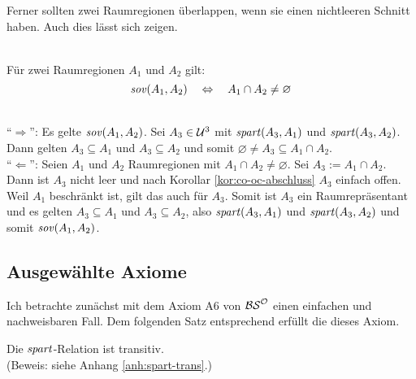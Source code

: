 %    
%    
%    
    Ferner sollten zwei Raumregionen überlappen, wenn sie einen nichtleeren Schnitt haben.
		Auch dies lässt sich zeigen.
    \begin{satz}\label{satz:sov-raumreg}\ \\
        Für zwei Raumregionen $A_1$ und $A_2$ gilt: 
        $$\mathit{sov}(A_1,A_2) \quad \Leftrightarrow \quad A_1 \cap A_2 \neq \varnothing$$
    \end{satz}
    \begin{bew}\ \\
        ``$\boldsymbol{\Rightarrow}$'':
        Es gelte $\mathit{sov}(A_1,A_2)$. 
        Sei $A_3 \in \mathcal{U}^3$ mit $\mathit{spart}(A_3,A_1)$ und $\mathit{spart}(A_3,A_2)$.
        Dann gelten $A_3 \subseteq A_1$ und $A_3 \subseteq A_2$ und somit $\varnothing \neq A_3 \subseteq A_1 \cap A_2$.\\
        ``$\boldsymbol{\Leftarrow}$'':
        Seien $A_1$ und $A_2$ Raumregionen mit $A_1 \cap A_2 \neq \varnothing$.
        Sei $A_3 := A_1 \cap A_2$.
        Dann ist $A_3$ nicht leer und nach Korollar \ref{kor:co-oc-abschluss} $A_3$ einfach offen.
        Weil $A_1$ beschränkt ist, gilt das auch für $A_3$.
        Somit ist $A_3$ ein Raumrepräsentant und es gelten $A_3 \subseteq A_1$ und $A_3 \subseteq A_2$, also $\mathit{spart}(A_3,A_1)$ und $\mathit{spart}(A_3,A_2)$ und somit $\mathit{sov}(A_1,A_2)$.
    \end{bew}


\subsection{Ausgewählte Axiome}

    Ich betrachte zunächst mit dem Axiom A6 von $\mathcal{BS}^{\mathcal{O}}$ einen einfachen und nachweisbaren Fall. Dem folgenden Satz entsprechend erfüllt die \strukt dieses Axiom.     %
    \begin{satz}\label{satz:spart-trans}
        Die $\mathit{spart}$-Relation ist transitiv.\\
        (Beweis: siehe Anhang \ref{anh:spart-trans}.)
    \end{satz}

